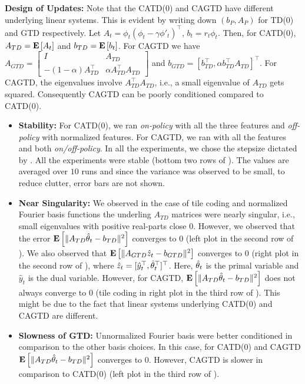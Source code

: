 \textbf{Design of Updates:} Note that the CATD(0) and CAGTD have different underlying linear systems. This is evident by writing down $(b_P,A_P)$ for TD(0) and GTD respectively. Let $A_t=\phi_t(\phi_t-\gamma\phi'_t)^\top$, $b_t=r_t \phi_t$.
Then, for CATD(0), $A_{TD}=\mathbf{E}\left[A_t\right]$ and $b_{TD}=\mathbf{E}\left[b_t\right]$.  For CAGTD we have $A_{GTD}=\left[\begin{matrix}I & A_{TD} \\ -(1-\alpha )A_{TD}^\top &\alpha A_{TD}^\top A_{TD}\end{matrix}\right]$ and $b_{GTD}=[b_{TD}^\top,\alpha b_{TD}^\top A_{TD}]^\top$. For CAGTD, the eigenvalues involve $A_{TD}^\top A_{TD}$, i.e., a small eigenvalue of $A_{TD}$ gets squared.
Consequently CAGTD can be poorly conditioned compared to CATD(0).

\begin{itemize}[leftmargin=*]
\item \textbf{Stability:} For CATD(0), we ran  \emph{on-policy} with all the three features and \emph{off-policy} with normalized features. For CAGTD, we ran with all the features and both \emph{on/off-policy}. In all the experiments, we chose the stepsize dictated by . All the experiments were stable (bottom two rows of ). The values are averaged over $10$ runs  and since the variance was observed to be small, 
to reduce clutter, error bars are not shown.
\item \textbf{Near Singularity: } We observed in the case of tile coding and normalized Fourier basis functions the underling $A_{TD}$ matrices were nearly singular, i.e., small eigenvalues with positive real-parts close $0$. However, we observed that the error $\mathbf{E}\left[\| A_{TD}\hat{\theta}_t -b_{TD}\|^2\right]$ converges to $0$ (left plot in the second row of ). We also observed that $\mathbf{E}\left[\| A_{GTD}\hat{z}_t-b_{GTD}\|^2\right]$ converges to $0$ (right plot in the second row of ), where $\hat{z}_t=[\hat{y}_t^\top,\hat{\theta}_t^\top]^\top$. Here, $\hat{\theta}_t$ is the primal variable and $\hat{y}_t$ is the dual variable. However, for CAGTD, $\mathbf{E}\left[\| A_{TD}\hat{\theta}_t-b_{TD}\|^2\right]$ does not always converge to $0$ (tile coding in right plot in the third row of ). This might be due to the fact that linear systems underlying CATD(0) and CAGTD are different. 
\item \textbf{Slowness of GTD:} Unnormalized Fourier basis were better conditioned in comparison to the other basis choices. In this case, for CATD(0) and CAGTD $\mathbf{E}\left[\| A_{TD}\hat{\theta}_t -b_{TD}\|^2\right]$ converges to $0$. However,  CAGTD is slower in comparison to CATD(0) (left plot in the third row of ). 
\end{itemize}

